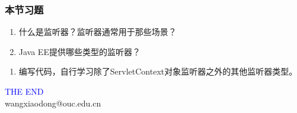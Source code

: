 \begin{frame}
  \frametitle{本节习题}

  
  \begin{enumerate}
  \item 什么是监听器？监听器通常用于那些场景？
  \item Java EE提供哪些类型的监听器？
  \end{enumerate}


  \begin{enumerate}
  \item 编写代码，自行学习除了ServletContext对象监听器之外的其他监听器类型。
  \end{enumerate}
\end{frame}
\begin{frame}
\centering
{\Huge \textcolor{blue}{THE END}} \\
\vspace{5mm}
{\Large wangxiaodong@ouc.edu.cn} \\
\end{frame}

